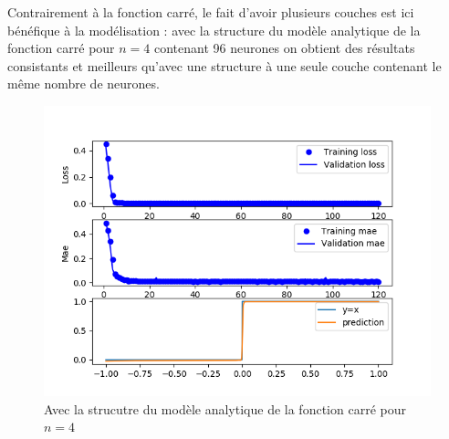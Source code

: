 \documentclass[a4paper,11pt,twoside]{report}
\begin{document}
	Contrairement à la fonction carré, le fait d'avoir plusieurs couches est ici bénéfique à la modélisation : avec la structure du modèle analytique de la fonction carré pour $n=4$ contenant 96 neurones on obtient des résultats consistants et meilleurs qu'avec une structure à une seule couche contenant le même nombre de neurones.
	\begin{figure}[H]
	\begin{center}
	\includegraphics[width=0.7\linewidth]{hvsq.png}
	\caption{Avec la strucutre du modèle analytique de la fonction carré pour $n=4$}
	\end{center}
	\end{figure}


\end{document}

